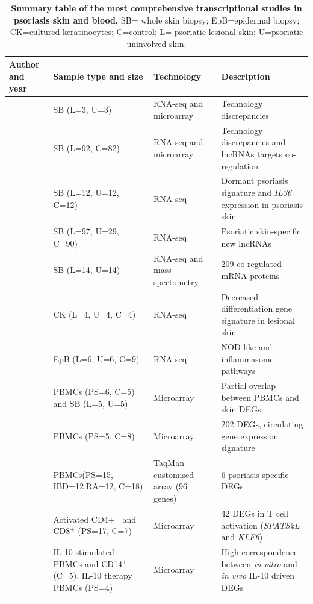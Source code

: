 \begin{landscape}
\begin{center}
\begin{longtable}[ht]{p{.25\textheight} p{.40\textheight} p{.25\textheight} p{.60\textheight}}
\caption[Summary table of the most comprehensive transcriptional studies in psoriasis skin and blood.]{\textbf{Summary table of the most comprehensive transcriptional studies in psoriasis skin and blood.} SB= whole skin biopsy; EpB=epidermal biopsy; CK=cultured keratinocytes; C=control; L= psoriatic lesional skin; U=psoriatic uninvolved skin.}
\label{tab:Skin_and_blood_transcriptomics} \\
\toprule
\textbf{Author and year} & \textbf{Sample type and size} & \textbf{Technology} & \textbf{Description}\\
\midrule
\midrule
\parencite{Jabbari2012}	   & SB (L=3, U=3)         & RNA-seq and microarray & Technology discrepancies     \\
\parencite{Li2014}	       & SB (L=92, C=82)       & RNA-seq and microarray & Technology discrepancies and lncRNAs targets co-regulation\\
\parencite{Keermann2015}	 & SB (L=12, U=12, C=12) & RNA-seq                & Dormant psoriasis signature and \textit{IL36} expression in psoriasis skin \\
\parencite{Tsoi2015}	     & SB (L=97, U=29, C=90) & RNA-seq                & Psoriatic skin-specific new lncRNAs\\
\parencite{Swindell2015}   & SB (L=14, U=14)       & RNA-seq and mass-spectometry & 209 co-regulated mRNA-proteins \\
\parencite{Swindell2017}	 & CK (L=4, U=4, C=4)    & RNA-seq                & Decreased differentiation gene signature in lesional skin\\
\parencite{Tervaniemi2016} & EpB (L=6, U=6, C=9)   & RNA-seq                & NOD-like and inflammasome pathways\\
\parencite{Coda2012}   & PBMCs (PS=6, C=5) and SB (L=5, U=5)   & Microarray             & Partial overlap between PBMCs and skin DEGs\\
\parencite{Lee2009}	   & PBMCs (PS=5, C=8)	      & Microarray             & 202 DEGs, circulating gene expression signature \\
\parencite{Mesko2010}  & PBMCs(PS=15, IBD=12,RA=12, C=18)      &  TaqMan customised array (96 genes)     & 6 psoriasis-specific DEGs \\
\parencite{Palau2013}	 & Activated CD4+$^+$ and CD8$^+$  (PS=17, C=7) & Microarray  & 42 DEGs in T cell activation (\textit{SPATS2L} and \textit{KLF6})\\
\parencite{Jung2004}  & IL-10 stimulated PBMCs and CD14$^+$ (C=5), IL-10 therapy PBMCs (PS=4) & Microarray  & High correspondence between \textit{in vitro} and \textit{in vivo} IL-10 driven DEGs \\
\bottomrule
\medskip
\end{longtable}
\end{center}
\end{landscape}

